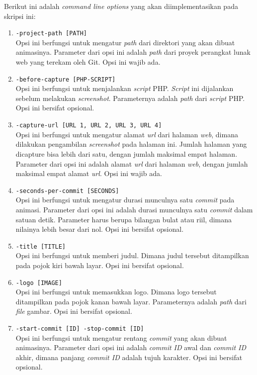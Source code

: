 Berikut ini adalah \textit{command line options} yang akan diimplementasikan pada skripsi ini:
\begin{enumerate}
\item \texttt{-project-path [PATH]}\\
Opsi ini berfungsi untuk mengatur \textit{path} dari direktori yang akan dibuat animasinya. Parameter dari opsi ini adalah \textit{path} dari proyek perangkat lunak web yang terekam oleh Git. Opsi ini wajib ada.

\item \texttt{-before-capture [PHP-SCRIPT]}\\
Opsi ini berfungsi untuk menjalankan \textit{script} PHP. \textit{Script} ini dijalankan sebelum melakukan \textit{screenshot}. Parameternya adalah \textit{path} dari \textit{script} PHP. Opsi ini bersifat opsional.

\item \texttt{-capture-url [URL 1, URL 2, URL 3, URL 4]}\\
Opsi ini berfungsi untuk mengatur alamat \textit{url} dari halaman \textit{web}, dimana dilakukan pengambilan \textit{screenshot} pada halaman ini. Jumlah halaman yang dicapture bisa lebih dari satu, dengan jumlah maksimal empat halaman. Parameter dari opsi ini adalah alamat \textit{url} dari halaman \textit{web}, dengan jumlah maksimal empat alamat \textit{url}. Opsi ini wajib ada.

\item \texttt{-seconds-per-commit [SECONDS]}\\
Opsi ini berfungsi untuk mengatur durasi munculnya satu \textit{commit} pada animasi. Parameter dari opsi ini adalah durasi munculnya satu \textit{commit} dalam satuan detik. Parameter harus berupa bilangan bulat atau riil, dimana nilainya lebih besar dari nol. Opsi ini bersifat opsional.

\item \texttt{-title [TITLE]}\\
Opsi ini berfungsi untuk memberi judul. Dimana judul tersebut ditampilkan pada pojok kiri
bawah layar. Opsi ini bersifat opsional. 

\item \texttt{-logo [IMAGE]}\\
Opsi ini berfungsi untuk memasukkan logo. Dimana logo tersebut ditampilkan pada pojok kanan
bawah layar. Parameternya adalah \textit{path} dari \textit{file} gambar. Opsi ini bersifat opsional.

\item \texttt{-start-commit [ID] -stop-commit [ID]}\\
Opsi ini berfungsi untuk mengatur rentang \textit{commit} yang akan dibuat animasinya. Parameter dari opsi ini adalah \textit{commit ID} awal dan \textit{commit ID} akhir, dimana panjang \textit{commit ID} adalah tujuh karakter. Opsi ini bersifat opsional. 
\end{enumerate}

